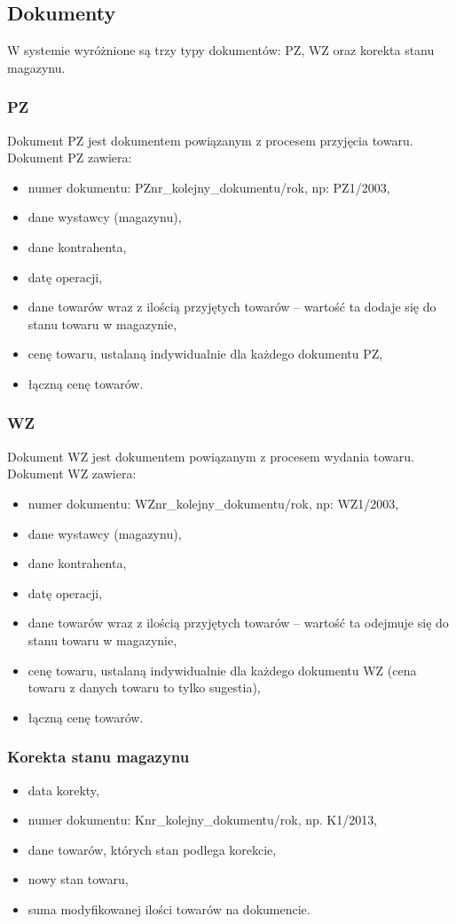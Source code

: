 \subsection{Dokumenty}
W systemie wyróżnione są trzy typy dokumentów: PZ, WZ oraz korekta stanu magazynu.

\subsubsection{PZ}
Dokument PZ jest dokumentem powiązanym z procesem przyjęcia towaru.
Dokument PZ zawiera:
\begin{itemize}
	\item numer dokumentu: PZnr\_kolejny\_dokumentu/rok, np: PZ1/2003,
	\item dane wystawcy (magazynu),
	\item dane kontrahenta,
	\item datę operacji,
	\item dane towarów wraz z ilością przyjętych towarów -- wartość ta dodaje się do stanu towaru w magazynie,
	\item cenę towaru, ustalaną indywidualnie dla każdego dokumentu PZ,
	\item łączną cenę towarów.
\end{itemize}

\subsubsection{WZ}
Dokument WZ jest dokumentem powiązanym z procesem wydania towaru.
Dokument WZ zawiera:
\begin{itemize}
	\item numer dokumentu: WZnr\_kolejny\_dokumentu/rok, np: WZ1/2003,
	\item dane wystawcy (magazynu),
	\item dane kontrahenta,
	\item datę operacji,
	\item dane towarów wraz z ilością przyjętych towarów -- wartość ta odejmuje się do stanu towaru w magazynie,
	\item cenę towaru, ustalaną indywidualnie dla każdego dokumentu WZ (cena towaru z danych towaru to tylko sugestia),
	\item łączną cenę towarów.
\end{itemize}

\subsubsection{Korekta stanu magazynu}
\begin{itemize}
	\item data korekty,
	\item numer dokumentu: Knr\_kolejny\_dokumentu/rok, np. K1/2013,
	\item dane towarów, których stan podlega korekcie,
	\item nowy stan towaru,
	\item suma modyfikowanej ilości towarów na dokumencie.
\end{itemize}

